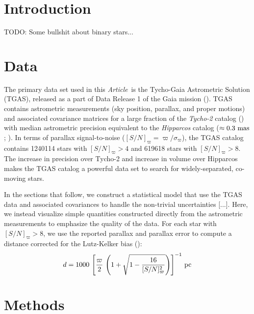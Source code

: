 \documentclass[manuscript, letterpaper]{aastex6}
\newcommand{\project}[1]{\textsl{#1}}
\newcommand{\documentname}{\textsl{Article}}
\newcommand{\snr}{[S/N]_\varpi}
\newcommand{\todo}[1]{{\color{red}TODO: #1}}
\begin{document}

\section{Introduction} \label{sec:intro}

\todo{Some bullshit about binary stars...}

\section{Data} \label{sec:data}

The primary data set used in this \documentname\ is the Tycho-Gaia Astrometric
Solution (TGAS), released as a part of Data Release 1 of the Gaia mission
(\citealt{many}). TGAS contains astrometric measurements (sky position,
parallax, and proper motions) and associated covariance matrices for a large
fraction of the \project{Tycho-2} catalog (\citealt{tycho2}) with median
astrometric precision equivalent to the \project{Hipparcos} catalog ($\approx
0.3~{\rm mas}$; \citealt{hipparcos}). In terms of parallax signal-to-noise
($\snr = \varpi/\sigma_\varpi$), the TGAS catalog contains 1240114 stars
with $\snr > 4$ and 619618 stars with $\snr > 8$. The increase in precision over
Tycho-2 and increase in volume over Hipparcos makes the TGAS catalog a powerful
data set to search for widely-separated, co-moving stars.

In the sections that follow, we construct a statistical model that use the TGAS
data and associated covariances to handle the non-trivial uncertainties [...].
Here, we instead visualize simple quantities constructed directly from the
astrometric measurements to emphasize the quality of the data. For each star
with $\snr > 8$, we use the reported parallax and parallax error to compute a
distance corrected for the Lutz-Kelker bias (\citealt{lutzkelker}):
\begin{equation}
  d = 1000 \, \left[\frac{\varpi}{2} \, \left(1 + \sqrt{1 - \frac{16}{\snr^2}} \right) \right]^{-1} \, {\rm pc}
\end{equation}

\section{Methods} \label{sec:methods}
\end{document}

